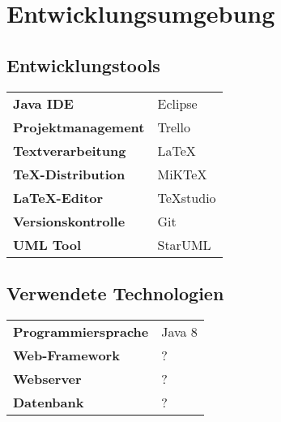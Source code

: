 \chapter{Entwicklungsumgebung}
\section{Entwicklungstools}
\begin{table}[h!]
	\bgroup
	\def\arraystretch{1.5}
	\begin{tabular}{p{4cm}|l}
		\textbf{Java IDE} & Eclipse\\
		\textbf{Projektmanagement} & Trello\\
		\textbf{Textverarbeitung} & \LaTeX\\
		\textbf{TeX-Distribution} & MiKTeX\\
		\textbf{\LaTeX-Editor} & TeXstudio\\
		\textbf{Versionskontrolle} & Git\\
		\textbf{UML Tool} & StarUML
	\end{tabular}
	\egroup
\end{table}
\section{Verwendete Technologien}
\begin{table}[h!]
	\bgroup
	\def\arraystretch{1.5}
	\begin{tabular}{p{4cm}|l}
		\textbf{Programmiersprache} & Java 8\\
		\textbf{Web-Framework} & ?\\
		\textbf{Webserver} & ?\\
		\textbf{Datenbank} & ?
	\end{tabular}
	\egroup
\end{table}